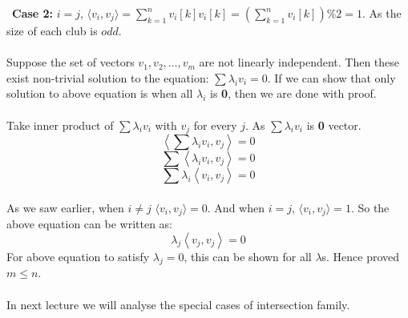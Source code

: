 ~\textbf{Case 2:} $i= j$, $\langle v_i,v_j\rangle = \sum_{k=1}^{n} v_i[k]v_i[k] = (\sum_{k=1}^{n} v_i[k])\%2= 1$. As the size of each club is $odd$.\\\\
Suppose the set of vectors $v_1, v_2, \hdots, v_m$ are not linearly independent. Then these exist non-trivial solution to the equation: $\sum \lambda_i v_i=0$. If we can show that only solution to above equation is when all $\lambda_i$ is \textbf{0}, then we are done with proof.\\\\
Take inner product of $\sum \lambda_i v_i$ with $v_j$ for every $j$. As $\sum \lambda_i v_i$ is \textbf{0} vector.
$$ \left \langle \sum \lambda_i v_i,v_j\right\rangle = 0$$
$$  \sum \left \langle \lambda_i v_i,v_j\right\rangle = 0$$
$$  \sum \lambda_i \left \langle  v_i,v_j\right\rangle = 0$$\\
As we saw earlier, when $i\neq j$ $\langle v_i,v_j\rangle=0$. And when $i= j$, $\langle v_i,v_j\rangle=1$. So the above equation can be written as:
$$  \lambda_j \left \langle  v_j,v_j\right\rangle = 0$$
For above equation to satisfy $\lambda_j=0$, this can be shown for all $\lambda$s. Hence proved $m\le n$.\\\\
In next lecture we will analyse the special cases of intersection family.


